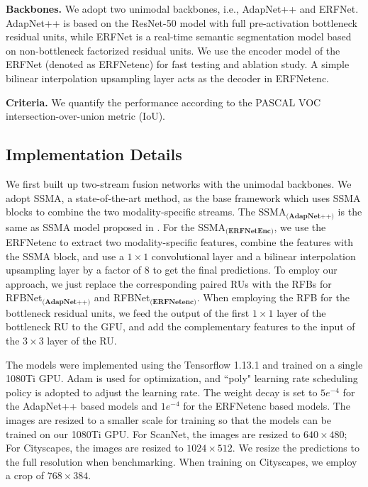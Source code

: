 \documentclass[letterpaper, 10 pt, conference]{ieeeconf}
\begin{document}
	\textbf{Backbones.}
	We adopt two unimodal backbones, i.e., AdapNet++\cite{valada2019self} and ERFNet\cite{romera2017erfnet}. AdapNet++ is based on the ResNet-50 model with full pre-activation bottleneck residual units, while ERFNet is a real-time semantic segmentation model based on non-bottleneck factorized residual units. We use the encoder model of the ERFNet (denoted as ERFNetenc) for fast testing and ablation study. A simple bilinear interpolation upsampling layer acts as the decoder in ERFNetenc.
	
	\textbf{Criteria.} We quantify the performance according to the PASCAL VOC intersection-over-union metric (IoU)\cite{everingham2015pascal}.

	\subsection{Implementation Details}
	We first built up two-stream fusion networks with the unimodal backbones. We adopt SSMA\cite{valada2019self}, a state-of-the-art method, as the base framework which uses SSMA blocks to combine the two modality-specific streams. The SSMA$_{\textbf{(AdapNet++)}}$ is the same as SSMA model proposed in \cite{valada2019self}. For the SSMA$_{\textbf{(ERFNetEnc)}}$, we use the ERFNetenc to extract two modality-specific features, combine the features with the SSMA block, and use a $1\times 1$ convolutional layer and a bilinear interpolation upsampling layer by a factor of 8 to get the final predictions. 
	To employ our approach, we just replace the corresponding paired RUs with the RFBs for RFBNet$_{\textbf{(AdapNet++)}}$ and RFBNet$_{\textbf{(ERFNetenc)}}$. When employing the RFB for the bottleneck residual units, we feed the output of the first $1\times 1$ layer of the bottleneck RU to the GFU, and add the complementary features to the input of the $3\times 3$ layer of the RU.
	
	The models were implemented using the Tensorflow 1.13.1 and trained on a single 1080Ti GPU. Adam is used for optimization, and ``poly" learning rate scheduling policy is adopted to adjust the learning rate. The weight decay is set to $5e^{-4}$ for the AdapNet++ based models and $1e^{-4}$ for the ERFNetenc based models. The images are resized to a smaller scale for training so that the models can be trained on our 1080Ti GPU. For ScanNet, the images are resized to $640\times 480$; For Cityscapes, the images are resized to $1024\times 512$. We resize the predictions to the full resolution when benchmarking. When training on Cityscapes, we employ a crop of $768\times 384$. 
	
\end{document}
